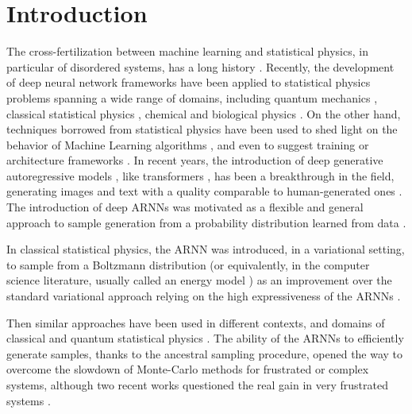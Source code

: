 \documentclass[aps,physrev,10pt,floatfix,reprint]{revtex4-2}
\begin{document}
\section{Introduction} 
The cross-fertilization between machine learning and statistical physics, in particular of disordered systems, has a long history \cite{doi:10.1073/pnas.79.8.2554, PhysRevA.32.1007}.
Recently, the development of deep neural network frameworks \cite{bengioNatureDeepLearning2015} have been applied to statistical physics problems \cite{RevModPhys.91.045002} spanning a wide range of domains, including quantum mechanics \cite{doi:10.1126/science.aag2302, Nieuwenburg2017}, 
classical statistical physics \cite{Carrasquilla2017, Wu2019}, chemical and biological physics \cite{noe2019boltzmann,jumper2021highly}.
On the other hand, techniques borrowed from statistical physics have been used to shed light on the behavior of Machine Learning algorithms \cite{doi:10.1080/00018732.2016.1211393, Nguyen2017}, and even to suggest training or architecture frameworks \cite{Chaudhari_2019, pmlr-v37-sohl-dickstein15}.
In recent years, the introduction of deep generative autoregressive models \cite{pmlr-v37-germain15, NIPS2016_b1301141}, like transformers \cite{NIPS2017_3f5ee243}, has been a breakthrough in the field, generating images and text with a quality comparable to human-generated ones \cite{https://doi.org/10.48550/arxiv.2005.14165}.  
The introduction of deep ARNNs was motivated as a flexible and general approach to sample generation from a probability distribution learned from data \cite{pmlr-v32-gregor14, pmlr-v15-larochelle11a, pmlr-v48-oord16}. 

In classical statistical physics, the ARNN was introduced, in a variational setting, to sample from a Boltzmann distribution (or equivalently, in the computer science literature, usually called an energy model \cite{pmlr-v97-durkan19a}) as an improvement over the standard variational approach relying on the high expressiveness of the ARNNs \cite{Wu2019}. 

Then similar approaches have been used in different contexts, and domains of classical \cite{10.1103/physreve.101.023304,PhysRevE.101.053312,PhysRevE.103.012103,PhysRevResearch.3.L042024,10.1038/s42256-021-00401-3} and quantum statistical physics \cite{10.1103/physrevlett.128.090501,PhysRevA.102.062413,PhysRevLett.124.020503,PhysRevResearch.2.023358, Liu_2021, Barrett2022, Cha_2022}. The ability of the ARNNs to efficiently generate samples, thanks to the ancestral sampling procedure, opened the way to overcome the slowdown of Monte-Carlo methods for frustrated or complex systems, although two recent works questioned the real gain in very frustrated systems \cite{condmat7020038,https://doi.org/10.48550/arxiv.2210.11145}. 
\end{document}
